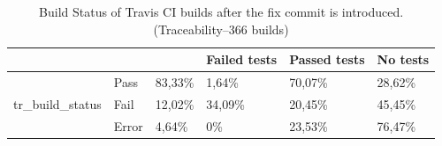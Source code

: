 \documentclass[10pt,conference]{IEEEtran}
\begin{document}
\begin{table}[t]
\centering
\begin{tabular}{lll|lll}
\hline
\multicolumn{3}{l|}{}                                & Failed tests & Passed tests & No tests \\ \hline
\multirow{3}{*}{tr\_build\_status} & Pass  & 83,33\% & 1,64\%       & 70,07\%      & 28,62\%  \\
                                   & Fail  & 12,02\% & 34,09\%      & 20,45\%      & 45,45\%  \\
                                   & Error & 4,64\%  & 0\%          & 23,53\%      & 76,47\%  \\ \hline
\end{tabular}
\label{tab:afterfix}
\caption{Build Status of Travis CI builds after the fix commit is introduced. \\ (Traceability--366 builds)}
\end{table}
\end{document}
